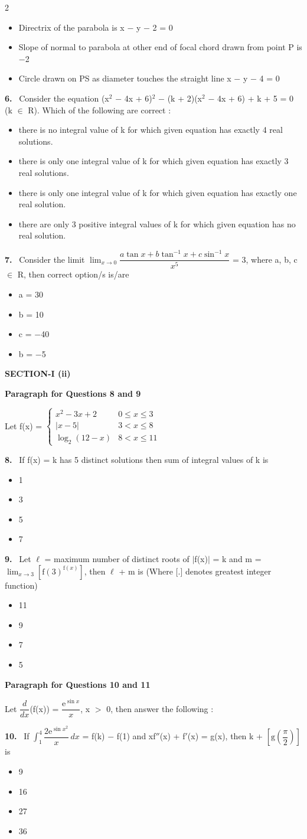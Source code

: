 \documentclass[10pt]{extarticle}
\newcommand{\sect}[1]{\par\smallskip\noindent\textbf{#1}\par}
\newcommand{\qn}[1]{\par\smallskip\noindent\textbf{#1.}~}
\newcommand{\paraq}[2]{\par\smallskip\noindent\textbf{Paragraph for Questions #1 and #2}\par}
\newenvironment{qoptions}{\begin{itemize}[leftmargin=1.8em,itemsep=1pt,topsep=2pt,label={}]}{\end{itemize}}
\newcommand{\opt}[2]{\item[(#1)] #2}
\begin{document}
\begin{multicols}{2}
\begin{qoptions}
\opt{B}{Directrix of the parabola is x $-$ y $-$ 2 = 0}
\opt{C}{Slope of normal to parabola at other end of focal chord drawn from point P is $-$2}
\opt{D}{Circle drawn on PS as diameter touches the straight line x $-$ y $-$ 4 = 0}
\end{qoptions}
\qn{6} Consider the equation (x$^2$ $-$ 4x + 6)$^2$ $-$ (k + 2)(x$^2$ $-$ 4x + 6) + k + 5 = 0 (k $\in$ R). Which of the following are correct :
\begin{qoptions}
\opt{A}{there is no integral value of k for which given equation has exactly 4 real solutions.}
\opt{B}{there is only one integral value of k for which given equation has exactly 3 real solutions.}
\opt{C}{there is only one integral value of k for which given equation has exactly one real solution.}
\opt{D}{there are only 3 positive integral values of k for which given equation has no real solution.}
\end{qoptions}
\qn{7} Consider the limit $\displaystyle\lim_{x\to0}\dfrac{a\tan x+b\tan^{-1}x+c\sin^{-1}x}{x^5}$ = 3, where a, b, c $\in$ R, then correct option/s is/are
\begin{qoptions}
\opt{A}{a = 30}
\opt{B}{b = 10}
\opt{C}{c = $-$40}
\opt{D}{b = $-$5}
\end{qoptions}
\sect{SECTION-I (ii)}
\paraq{8}{9}
Let f(x) = $\begin{cases}x^2-3x+2 & 0\le x\le3\\ |x-5| & 3<x\le8\\ \log_2(12-x) & 8<x\le11\end{cases}$
\qn{8} If f(x) = k has 5 distinct solutions then sum of integral values of k is
\begin{qoptions}
\opt{A}{1}
\opt{B}{3}
\opt{C}{5}
\opt{D}{7}
\end{qoptions}
\qn{9} Let $\ell$ = maximum number of distinct roots of $|$f(x)$|$ = k and m = $\displaystyle\lim_{x\to3}\left[\mathrm f(3)^{\mathrm f(x)}\right]$, then $\ell$ + m is (Where [.] denotes greatest integer function)
\begin{qoptions}
\opt{A}{11}
\opt{B}{9}
\opt{C}{7}
\opt{D}{5}
\end{qoptions}
\paraq{10}{11}
Let $\dfrac d{dx}$(f(x)) = $\dfrac{\mathrm e^{\sin x}}x$, x $>$ 0, then answer the following :
\qn{10} If $\displaystyle\int_1^4\dfrac{2\mathrm e^{\sin x^2}}x\,dx$ = f(k) $-$ f(1) and xf$''$(x) + f$'$(x) = g(x), then k + $\left[\mathrm g\left(\dfrac\pi2\right)\right]$ is
\begin{qoptions}
\opt{A}{9}
\opt{B}{16}
\opt{C}{27}
\opt{D}{36}
\end{qoptions}

\end{multicols}
\end{document}

